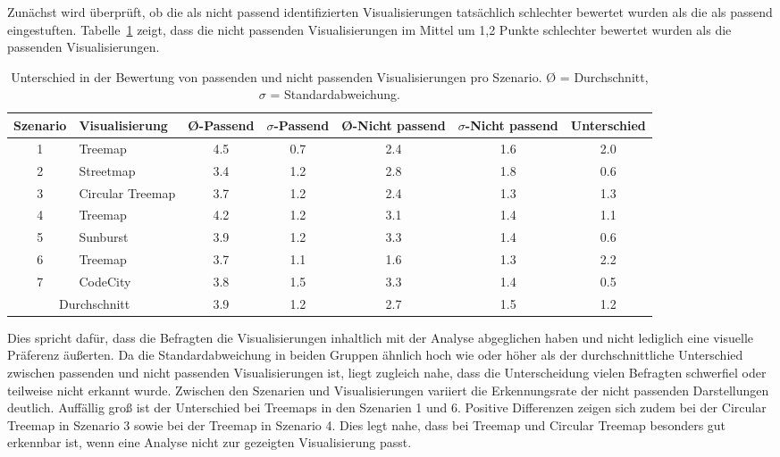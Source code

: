 Zunächst wird überprüft, ob die als nicht passend identifizierten Visualisierungen tatsächlich schlechter bewertet wurden als die als passend eingestuften. Tabelle~\ref{tab:passendNichtPassend} zeigt, dass die nicht passenden Visualisierungen im Mittel um 1{,}2 Punkte schlechter bewertet wurden als die passenden Visualisierungen.
\begin{table}[htbp]
    \hspace*{-1.0cm}
    \scriptsize
    \begin{tabular}{|c|l|c|c|c|c|c|}
        \hline
            \textbf{Szenario} & \textbf{Visualisierung} & \textbf{Ø-Passend} & \textbf{$\sigma$-Passend} & \textbf{Ø-Nicht passend} & \textbf{$\sigma$-Nicht passend} & \textbf{Unterschied} \\ \hline
            1 & Treemap & 4.5 & 0.7 & 2.4 & 1.6 & 2.0 \\
            2 & Streetmap & 3.4 & 1.2 & 2.8 & 1.8 & 0.6 \\
            3 & Circular Treemap & 3.7 & 1.2 & 2.4 & 1.3 & 1.3 \\
            4 & Treemap & 4.2 & 1.2 & 3.1 & 1.4 & 1.1 \\
            5 & Sunburst & 3.9 & 1.2 & 3.3 & 1.4 & 0.6 \\
            6 & Treemap & 3.7 & 1.1 & 1.6 & 1.3 & 2.2 \\
            7 & CodeCity & 3.8 & 1.5 & 3.3 & 1.4 & 0.5 \\ \hline
            \multicolumn{2}{|c|}{Durchschnitt} & 3.9 & 1.2 & 2.7 & 1.5 & 1.2 \\ \hline
    \end{tabular}
    \caption[Passend vs. nicht passend]{Unterschied in der Bewertung von passenden und nicht passenden Visualisierungen pro Szenario. Ø = Durchschnitt, $\sigma$ = Standardabweichung.}
    \label{tab:passendNichtPassend}
\end{table}
Dies spricht dafür, dass die Befragten die Visualisierungen inhaltlich mit der Analyse abgeglichen haben und nicht lediglich eine visuelle Präferenz äußerten. Da die Standardabweichung in beiden Gruppen ähnlich hoch wie oder höher als der durchschnittliche Unterschied zwischen passenden und nicht passenden Visualisierungen ist, liegt zugleich nahe, dass die Unterscheidung vielen Befragten schwerfiel oder teilweise nicht erkannt wurde. Zwischen den Szenarien und Visualisierungen variiert die Erkennungsrate der nicht passenden Darstellungen deutlich. Auffällig groß ist der Unterschied bei Treemaps in den Szenarien 1 und 6. Positive Differenzen zeigen sich zudem bei der Circular Treemap in Szenario 3 sowie bei der Treemap in Szenario 4. Dies legt nahe, dass bei Treemap und Circular Treemap besonders gut erkennbar ist, wenn eine Analyse nicht zur gezeigten Visualisierung passt.

